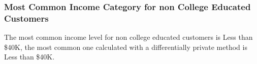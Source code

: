 \documentclass{article}%
\begin{document}
%
\subsubsection{Most Common Income Category for non College Educated Customers}%
\label{ssubsec:MostCommonIncomeCategoryfornonCollegeEducatedCustomers}%
The most common income level for non college educated customers is Less than \$40K, the most common one calculated with a differentially private method is Less than \$40K. 

%
\end{document}
